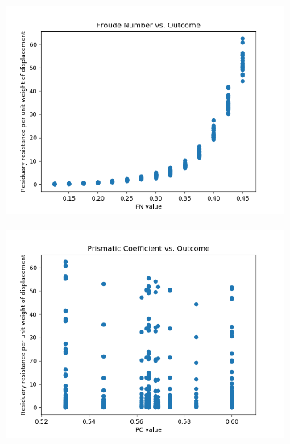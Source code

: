 \documentclass[11pt,a4paper]{article}
\begin{document}
\begin{figure}
	\centering
	\begin{subfigure}[h]{0.5\textwidth}
		\includegraphics[width=\textwidth]{fn}
		\caption{ }
		\label{fig:fn}
	\end{subfigure}
	\par\bigskip
	\begin{subfigure}[h]{0.5\textwidth}
		\includegraphics[width=\textwidth]{pc}
		\caption{ }
		\label{fig:pc}
	\end{subfigure}
	\par\bigskip
	\begin{subfigure}[h]{0.5\textwidth}

\end{subfigure}
\end{figure}
\end{document}
